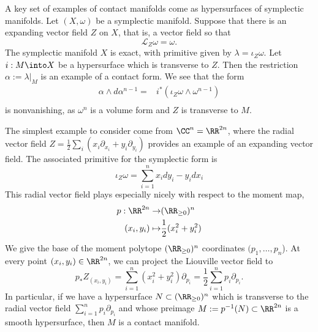 

    A key set of examples of contact manifolds come as hypersurfaces of symplectic manifolds. Let $(X, \omega)$ be a symplectic manifold. Suppose that there is an expanding vector field $Z$ on $X$, that is, a vector field so that 
    \[\mathcal L_Z \omega = \omega.\]
    The symplectic manifold $X$ is exact, with primitive given by $\lambda=\iota_Z \omega$.
    Let $i:M\into  X$ be a hypersurface which is transverse to $Z$. Then the restriction $\alpha:=\lambda|_M$ is an example of a contact form. We see that the form  
    \begin{align*}
        \alpha \wedge d\alpha^{n-1} =& i^* (\iota_Z \omega \wedge \omega^{n-1})\\
    \end{align*}
    is nonvanishing, as $\omega^n$ is a volume form and $Z$ is transverse to $M$.

    The simplest example to consider come from $\CC^n= \RR^{2n}$, where the radial vector field $Z=\frac{1}{2}\sum_i \left(x_i \partial_{x_i} + y_i\partial_{y_i}\right)$ provides an example of an expanding vector field. The associated primitive for the symplectic form is 
    \[\iota_Z \omega =\sum_{i=1}^n x_i dy_i-y_idx_i \]
     This radial vector field plays especially nicely with respect to the moment map, 
    \begin{align*}
        p: \RR^{2n}\to& (\RR_{\geq 0})^n\\
            (x_i, y_i)\mapsto&\frac{1}{2} (x_i^2+y_i^2)
    \end{align*}
    We give the base of the moment polytope $(\RR_{\geq 0})^n$ coordinates $(p_1, \ldots, p_n$).  
    At every point $(x_i, y_i)\in \RR^{2n}$, we can project the Liouville vector field to 
    \[p_*Z_{(x_i, y_i)}= \sum_{i=1}^n (x_i^2+y_i^2) \partial_{p_i} =\frac{1}{2}\sum_{i=1}^n  p_i \partial_{p_i}.\]
    In particular, if we have a hypersurface $N\subset (\RR_{\geq 0})^n$ which is transverse to the radial vector field $\sum_{i=1}^n  p_i \partial_{p_i}$ and whose preimage $M:=p^{-1}(N)\subset \RR^{2n}$ is a smooth hypersurface, then  $M$ is a contact manifold.
    \label{exm:contactManifold}
    
